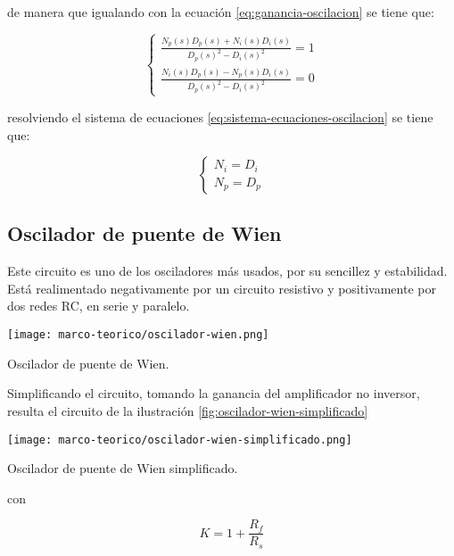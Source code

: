 de manera que igualando con la ecuación \ref{eq:ganancia-oscilacion} se tiene que:

\begin{equation}
  \begin{cases}
    \frac{N_p(s)D_p(s) + N_i(s)D_i(s)}{D_p(s)^2 - D_i(s)^2} = 1 \\
    \frac{N_i(s)D_p(s) - N_p(s)D_i(s)}{D_p(s)^2 - D_i(s)^2} = 0
  \end{cases}
  \label{eq:sistema-ecuaciones-oscilacion}
\end{equation}

resolviendo el sistema de ecuaciones \ref{eq:sistema-ecuaciones-oscilacion} se tiene que:

\begin{equation}
  \begin{cases}
    N_i = D_i \\
    N_p = D_p
  \end{cases}
\end{equation}

\subsection{Oscilador de puente de Wien}

Este circuito es uno de los osciladores más usados, por su sencillez y estabilidad. Está realimentado negativamente por un circuito resistivo y positivamente por dos redes RC, en serie y paralelo.

\begin{ilustracion}[ht]
  \centering
  \texttt{[image: marco-teorico/oscilador-wien.png]}
  \caption{Oscilador de puente de Wien.}
  \label{fig:oscilador-wien}
\end{ilustracion}

Simplificando el circuito, tomando la ganancia del amplificador no inversor, resulta el circuito de la ilustración \ref{fig:oscilador-wien-simplificado}

\begin{ilustracion}[ht]
  \centering
  \texttt{[image: marco-teorico/oscilador-wien-simplificado.png]}
  \caption{Oscilador de puente de Wien simplificado.}
  \label{fig:oscilador-wien-simplificado}
\end{ilustracion}

con

\begin{equation}
  K = 1 + \frac{R_f}{R_s}
  \label{eq:ganancia-no-inversor}
\end{equation}

